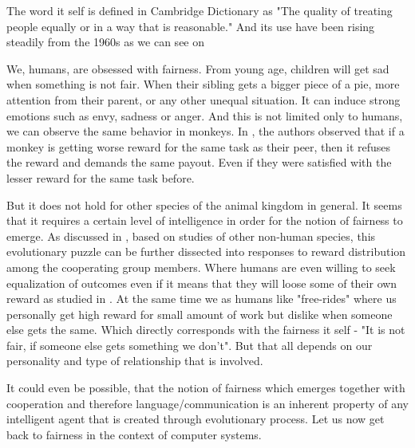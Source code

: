 
The word it self is defined in Cambridge Dictionary \cite{fairness_definition} as "The quality of treating people equally or in a way that is reasonable." And its use have been rising steadily from the 1960s as we can see on

We, humans, are obsessed with fairness. From young age, children will get sad when something is not fair. When their sibling gets a bigger piece of a pie, more attention from their parent, or any other unequal situation. It can induce strong emotions such as envy, sadness or anger. And this is not limited only to humans, we can observe the same behavior in monkeys. In \cite{brosnan2003monkeys}, the authors observed that if a monkey is getting worse reward for the same task as their peer, then it refuses the reward and demands the same payout. Even if they were satisfied with the lesser reward for the same task before.



But it does not hold for other species of the animal kingdom in general. It seems that it requires a certain level of intelligence in order for the notion of fairness to emerge. As discussed in \cite{brosnan2014evolution}, based on studies of other non-human species, this evolutionary puzzle can be further dissected into responses to reward distribution among the cooperating group members. Where humans are even willing to seek equalization of outcomes even if it means that they will loose some of their own reward as studied in \cite{willing_to_pay_to_equality}. At the same time we as humans like "free-rides" where us personally get high reward for small amount of work but dislike when someone else gets the same. Which directly corresponds with the fairness it self - "It is not fair, if someone else gets something we don't". But that all depends on our personality and type of relationship that is involved.

It could even be possible, that the notion of fairness which emerges together with cooperation and therefore language/communication is an inherent property of any intelligent agent that is created through evolutionary process.
\newline
Let us now get back to fairness in the context of computer systems.


